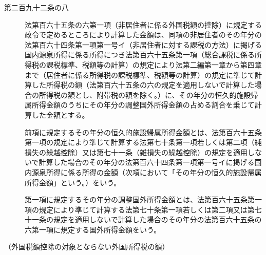 \documentclass[twocolumn,a4j,10pt]{ltjtarticle}
\begin{document}
\begin{description}
\item[第二百九十二条の八]法第百六十五条の六第一項（非居住者に係る外国税額の控除）に規定する政令で定めるところにより計算した金額は、同項の非居住者のその年分の法第百六十四条第一項第一号イ（非居住者に対する課税の方法）に掲げる国内源泉所得に係る所得につき法第百六十五条第一項（総合課税に係る所得税の課税標準、税額等の計算）の規定により法第二編第一章から第四章まで（居住者に係る所得税の課税標準、税額等の計算）の規定に準じて計算した所得税の額（法第百六十五条の六の規定を適用しないで計算した場合の所得税の額とし、附帯税の額を除く。）に、その年分の恒久的施設帰属所得金額のうちにその年分の調整国外所得金額の占める割合を乗じて計算した金額とする。
\item[]前項に規定するその年分の恒久的施設帰属所得金額とは、法第百六十五条第一項の規定により準じて計算する法第七十条第一項若しくは第二項（純損失の繰越控除）又は第七十一条（雑損失の繰越控除）の規定を適用しないで計算した場合のその年分の法第百六十四条第一項第一号イに掲げる国内源泉所得に係る所得の金額（次項において「その年分の恒久的施設帰属所得金額」という。）をいう。
\item[]第一項に規定するその年分の調整国外所得金額とは、法第百六十五条第一項の規定により準じて計算する法第七十条第一項若しくは第二項又は第七十一条の規定を適用しないで計算した場合のその年分の法第百六十五条の六第一項に規定する国外所得金額をいう。
\end{description}
\noindent\hspace{10pt}（外国税額控除の対象とならない外国所得税の額）
\end{document}

